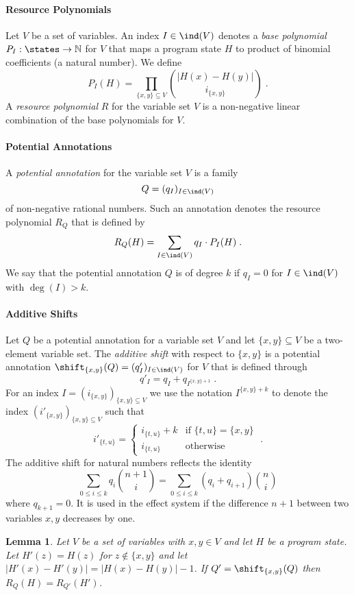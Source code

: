 \documentclass[10pt]{article}
\theoremstyle{newstyle}
\newtheorem{lemma}{Lemma}
\begin{document}
\paragraph{Resource Polynomials}

Let $V$ be a set of variables.  An index $I \in \ind(V)$ denotes a
\emph{base polynomial} $P_I : \states \to \N$ for $V$ that maps a
program state $H$ to product of binomial coefficients (a natural
number).  We define
$$
P_I(H) = \prod_{{\{x,y\}} \subseteq V} \binom {|H(x){-}H(y)|} {i_{\{x,y\}}} \; .
$$
%
A \emph{resource polynomial} $R$ for the variable set $V$ is a
non-negative linear combination of the base polynomials for $V$.

\paragraph{Potential Annotations}

A \emph{potential annotation} for the variable set $V$ is a family
$$Q = (q_I)_{I \in \ind(V)}$$ 
of non-negative rational numbers.  Such an annotation denotes the
resource polynomial $R_Q$ that is defined by
$$
R_Q(H) = \sum_{I \in \ind(V)} q_I \cdot P_I(H) \; .
$$
%
We say that the potential annotation $Q$ is of degree $k$ if $q_I = 0$
for $I \in \ind(V)$ with $\deg(I) > k$.

\paragraph{Additive Shifts}

Let $Q$ be a potential annotation for a variable set $V$ and let
$\{x,y\} \subseteq V$ be a two-element variable set.  The
\emph{additive shift} with respect to $\{x,y\}$ is a potential
annotation $\shift_{\{x,y\}}(Q) = (q'_I)_{I \in \ind(V)} $ for $V$
that is defined through
$$
q'_I = q_I + q_{I^{\{x,y\}{+}1}} \; .
$$
For an index $I = (i_{\{x,y\}})_{\{x,y\} \subseteq V}$ we use the
notation $I^{\{x,y\}{+}k}$ to denote the index
$(i'_{\{x,y\}})_{\{x,y\} \subseteq V}$ such that
$$
i'_{\{t,u\}} = \left\{
  \begin{array}{ll}
    i_{\{t,u\}} + k  & \text{if } \{t,u\} = \{x,y\} \\
    i_{\{t,u\}} & \text{otherwise}
  \end{array}
\right.
\;.
$$
%
The additive shift for natural numbers reflects the identity 
\begin{equation}
\label{eq:shift}
\sum_{0 {\leq} i \leq {k}} q_i \binom{n+1}{i} = \sum_{0 {\leq} i \leq {k}} (q_i{+}q_{i+1}) \binom{n}{i}
\end{equation}
where $q_{k+1} = 0$.  It is used in the effect system if the
difference $n+1$ between two variables $x,y$ decreases by one.

\begin{lemma}
  Let $V$ be a set of variables with $x,y \in V$ and let $H$ be a
  program state. Let $H'(z) = H(z)$ for $z \not\in \{x,y\}$ and let
  $|H'(x) {-} H'(y)| = |H(x) {-} H(y)| - 1$.
  If $Q' = \shift_{\{x,y\}}(Q)$ then $R_Q(H) = R_{Q'}(H')$.
\end{lemma}


\end{document}
